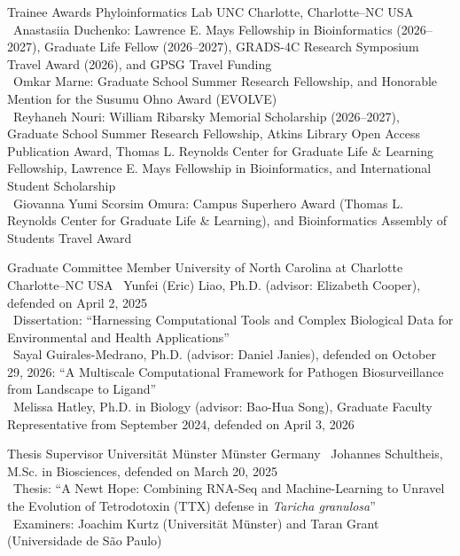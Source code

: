 \documentclass[11pt, letterpaper, sans]{moderncv}
\begin{document}
    {Trainee Awards}
    {Phyloinformatics Lab}
    {UNC Charlotte, Charlotte--NC}
    {USA}
        {
            \textbullet~Anastasiia Duchenko: Lawrence E. Mays Fellowship in Bioinformatics (2026--2027), Graduate Life Fellow (2026--2027), GRADS-4C Research Symposium Travel Award (2026), and GPSG Travel Funding\\
            \textbullet~Omkar Marne: Graduate School Summer Research Fellowship, and Honorable Mention for the Susumu Ohno Award (EVOLVE)\\
            \textbullet~Reyhaneh Nouri: William Ribarsky Memorial Scholarship (2026--2027), Graduate School Summer Research Fellowship, Atkins Library Open Access Publication Award, Thomas L. Reynolds Center for Graduate Life \& Learning Fellowship, Lawrence E. Mays Fellowship in Bioinformatics, and International Student Scholarship\\
            \textbullet~Giovanna Yumi Scorsim Omura: Campus Superhero Award (Thomas L. Reynolds Center for Graduate Life \& Learning), and Bioinformatics Assembly of Students Travel Award\\
        }

    {Graduate Committee Member}
    {University of North Carolina at Charlotte}
    {Charlotte--NC}
    {USA}
        {
            \textbullet~Yunfei (Eric) Liao, Ph.D. (advisor: Elizabeth Cooper), defended on April 2, 2025\\
            \textbullet~Dissertation: ``Harnessing Computational Tools and Complex Biological Data for Environmental and Health Applications''\\
            \textbullet~Sayal Guirales-Medrano, Ph.D. (advisor: Daniel Janies), defended on October 29, 2026: ``A Multiscale Computational Framework for Pathogen Biosurveillance from Landscape to Ligand''\\
            \textbullet~Melissa Hatley, Ph.D. in Biology (advisor: Bao-Hua Song), Graduate Faculty Representative from September 2024, defended on April 3, 2026\\
        }

    {Thesis Supervisor}
    {Universität Münster}
    {Münster}
    {Germany}
        {
            \textbullet~Johannes Schultheis, M.Sc. in Biosciences, defended on March 20, 2025\\
            \textbullet~Thesis: ``A Newt Hope: Combining RNA-Seq and Machine-Learning to Unravel the Evolution of Tetrodotoxin (TTX) defense in \textit{Taricha granulosa}''\\
            \textbullet~Examiners: Joachim Kurtz (Universität Münster) and Taran Grant (Universidade de São Paulo)\\
        }
\end{document}
